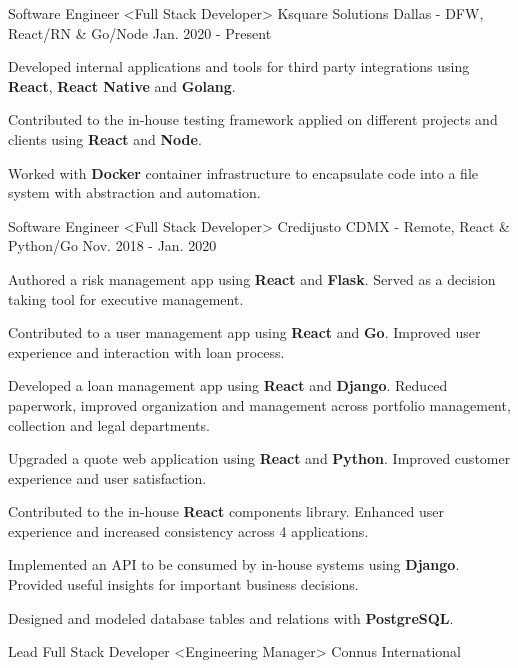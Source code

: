 \begin{cventries}
  \cventry
    {Software Engineer <Full Stack Developer>}
    {Ksquare Solutions}
    {Dallas - DFW, React/RN \& Go/Node}
    {Jan. 2020 - Present}
    {
      \begin{cvitems}
        \item {Developed internal applications and tools for third party integrations using \textbf{React}, \textbf{React Native} and \textbf{Golang}.}
        \item {Contributed to the in-house testing framework applied on different projects and clients using \textbf{React} and \textbf{Node}.}
        \item {Worked with \textbf{Docker} container infrastructure to encapsulate code into a file system with abstraction and automation.}
      \end{cvitems}
    }
  \cventry
    {Software Engineer <Full Stack Developer>}
    {Credijusto}
    {CDMX - Remote, React \& Python/Go}
    {Nov. 2018 - Jan. 2020}
    {
      \begin{cvitems}
        \item {Authored a risk management app using \textbf{React} and \textbf{Flask}. Served as a decision taking tool for executive management.}
        \item {Contributed to a user management app using \textbf{React} and \textbf{Go}. Improved user experience and interaction with loan process.}
        \item {Developed a loan management app using \textbf{React} and \textbf{Django}. Reduced paperwork, improved organization and management across portfolio management, collection and legal departments.}
        \item {Upgraded a quote web application using \textbf{React} and \textbf{Python}. Improved customer experience and user satisfaction.}
        \item {Contributed to the in-house \textbf{React} components library. Enhanced user experience and increased consistency across 4 applications.}
        \item {Implemented an API to be consumed by  in-house systems using \textbf{Django}. Provided useful insights for important business decisions.}
        \item {Designed and modeled database tables and relations with \textbf{PostgreSQL}.}
      \end{cvitems}
    }
  \cventry
    {Lead Full Stack Developer <Engineering Manager>}
    {Connus International}

\end{cventries}
